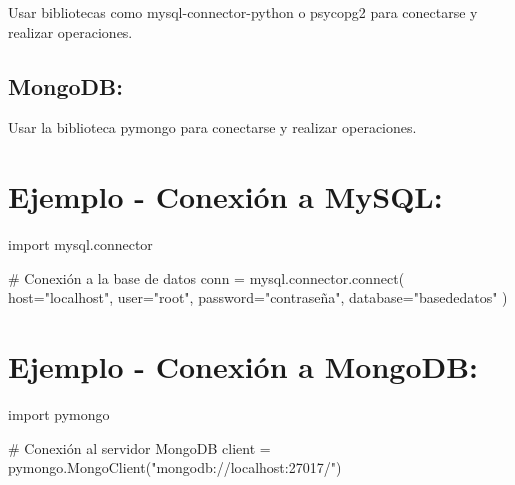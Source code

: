\documentclass[
  a4paper,
  onepage,
  openany]{scrreprt}
\newenvironment{Shaded}{\begin{snugshade}}{\end{snugshade}}
\newcommand{\CommentTok}[1]{\textcolor[rgb]{0.37,0.37,0.37}{#1}}
\newcommand{\ExtensionTok}[1]{\textcolor[rgb]{0.00,0.23,0.31}{#1}}
\newcommand{\ImportTok}[1]{\textcolor[rgb]{0.00,0.46,0.62}{#1}}
\newcommand{\NormalTok}[1]{\textcolor[rgb]{0.00,0.23,0.31}{#1}}
\newcommand{\OperatorTok}[1]{\textcolor[rgb]{0.37,0.37,0.37}{#1}}
\newcommand{\StringTok}[1]{\textcolor[rgb]{0.13,0.47,0.30}{#1}}
\begin{document}
Usar bibliotecas como mysql-connector-python o psycopg2 para conectarse
y realizar operaciones.

\hypertarget{mongodb-1}{%
\subsection{MongoDB:}\label{mongodb-1}}

Usar la biblioteca pymongo para conectarse y realizar operaciones.

\hypertarget{ejemplo---conexiuxf3n-a-mysql-1}{%
\section{Ejemplo - Conexión a
MySQL:}\label{ejemplo---conexiuxf3n-a-mysql-1}}

\begin{Shaded}
\begin{Highlighting}[]
\ImportTok{import}\NormalTok{ mysql.connector}

\CommentTok{\# Conexión a la base de datos}
\NormalTok{conn }\OperatorTok{=}\NormalTok{ mysql.connector.}\ExtensionTok{connect}\NormalTok{(}
\NormalTok{    host}\OperatorTok{=}\StringTok{"localhost"}\NormalTok{,}
\NormalTok{    user}\OperatorTok{=}\StringTok{"root"}\NormalTok{,}
\NormalTok{    password}\OperatorTok{=}\StringTok{"contraseña"}\NormalTok{,}
\NormalTok{    database}\OperatorTok{=}\StringTok{"basededatos"}
\NormalTok{)}
\end{Highlighting}
\end{Shaded}

\hypertarget{ejemplo---conexiuxf3n-a-mongodb-1}{%
\section{Ejemplo - Conexión a
MongoDB:}\label{ejemplo---conexiuxf3n-a-mongodb-1}}

\begin{Shaded}
\begin{Highlighting}[]
\ImportTok{import}\NormalTok{ pymongo}

\CommentTok{\# Conexión al servidor MongoDB}
\NormalTok{client }\OperatorTok{=}\NormalTok{ pymongo.MongoClient(}\StringTok{"mongodb://localhost:27017/"}\NormalTok{)}
\end{Highlighting}
\end{Shaded}
\end{document}
